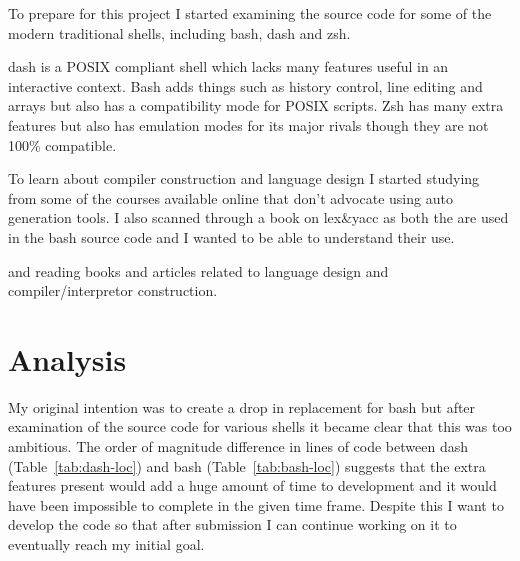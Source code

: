 To prepare for this project I started examining the source code for some of the modern traditional shells, including bash, dash and zsh.


dash is a POSIX compliant shell which lacks many features useful in an interactive context.
Bash adds things such as history control, line editing and arrays but also has a compatibility mode for POSIX scripts.
Zsh has many extra features but also has emulation modes for its major rivals though they are not 100\% compatible. 

To learn about compiler construction and language design I started studying from some of the courses available online that don't advocate using auto generation tools\cite{COMPILERS-COURSE,CRENSHAW}.
I also scanned through a book on lex\&yacc as both the are used in the bash source code and I wanted to be able to understand their use.

and reading books\cite{LEX-AND-YACC} and articles\cite{BUILD-INTERP,GOPHER-LEXING-BLOG} related to language design and compiler/interpretor construction. 




\section{Analysis} %

My original intention was to create a drop in replacement for bash but after examination of the source code for various shells it became clear that this was too ambitious.
The order of magnitude difference in lines of code between dash (Table~\ref{tab:dash-loc}) and bash (Table~\ref{tab:bash-loc}) suggests that the extra features present would add a huge amount of time to development and it would have been impossible to complete in the given time frame.
Despite this I want to develop the code so that after submission I can continue working on it to eventually reach my initial goal.

